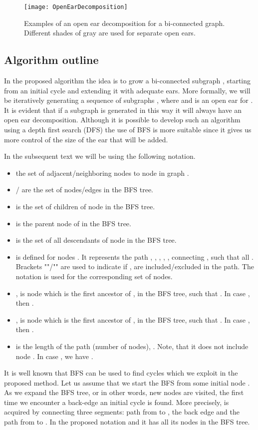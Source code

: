 \begin{figure}[tcb]
\centering
\texttt{[image: OpenEarDecomposition]}
\caption{Examples of an open ear decomposition for a bi-connected graph. Different shades of gray are used for separate open ears.}
\label{fig:OpenEarDecomposition}
\end{figure} 
\subsection{Algorithm outline}
In the proposed algorithm the idea is to grow a bi-connected subgraph , starting from an initial cycle and extending it with adequate ears.  More formally, we will be iteratively generating a sequence of subgraphs , where  and  is an open ear for .  It is evident that if a subgraph is generated in this way it will always have an open ear decomposition. Although  it  is possible to develop such an algorithm using a depth first search (DFS) the use of BFS is more suitable since it gives us more control of the size  of the ear that will be added.  

In the subsequent text we will be using the following notation. 
\begin{itemize}
\item{ the set  of adjacent/neighboring nodes to node  in graph . }
\item{/ are  the  set of nodes/edges in the BFS tree.  }
\item{ is the set of children of node  in the BFS tree.}
\item{ is the parent node of  in the BFS tree.}
\item{ is the set of all descendants of node  in the BFS tree. }
\item{ is defined for nodes . It represents the path , ,  , , ,  connecting ,   such that  all . Brackets ""/""  are used to indicate if ,  are included/excluded in the path. The notation  is  used for the corresponding set of nodes. }
\item{}, is node  which is the first ancestor of , in the BFS tree, such that . In case  , then . 
\item{}, is node  which is the first ancestor of , in the BFS tree, such that . In case  , then . 
\item{} is the length of the path (number of nodes), . Note, that it does not include node . In case , we have . 
\end{itemize}
It is well known that BFS can be used to find cycles which we exploit in the proposed method. Let us assume that we start the BFS from some initial node .  As we expand the BFS tree, or in other words, new nodes are visited,  the first time we encounter a back-edge  an initial cycle  is found. More precisely,   is acquired by connecting three segments:  path from  to , the back edge  and the path from  to . In the proposed notation  and it has all its nodes in the BFS tree.  

